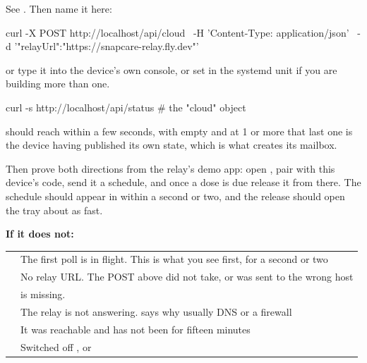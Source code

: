 \documentclass[11pt,a4paper]{article}
\begin{document}
\noindent See . Then name it here:

\begin{shell}
curl -X POST http://localhost/api/cloud \
     -H 'Content-Type: application/json' \
     -d '{"relayUrl":"https://snapcare-relay.fly.dev"}'
\end{shell}

\noindent or type it into the device's own console, or set
 in the systemd unit if you are building more than
one.

\begin{provebox}
\provetitle
\begin{shell}
curl -s http://localhost/api/status     # the "cloud" object
\end{shell}
\code{state} should reach \code{connected} within a few seconds, with
 empty and  at 1 or more \textemdash{} that
last one is the device having published its own state, which is what creates its
mailbox.

\vspace{1ex}
Then prove both directions from the relay's demo app: open
, pair with this device's code, send it a
schedule, and \textemdash{} once a dose is due \textemdash{} release it from
there. The schedule should appear in \code{payload} within a second or two, and
the release should open the tray about as fast.
\end{provebox}

\vspace{1mm}
\noindent\textbf{\sffamily If it does not:}

\begin{center}
\small
\begin{tabular}{@{}l >{\raggedright\arraybackslash}p{100mm}@{}}
\toprule
\hdr{\code{state}} & \hdr{What it means} \\
\midrule
\code{connecting} & The first poll is in flight. This is what you see first, for a second or two \\
\code{unpaired} & No relay URL. The POST above did not take, or was sent to the wrong host \\
\code{unsupported} & \code{python3-cryptography} is missing. \code{sudo apt install python3-cryptography} \\
\code{retrying} & The relay is not answering. \code{lastError} says why \textemdash{} usually DNS or a firewall \\
\code{offline} & It was reachable and has not been for fifteen minutes \\
\code{off} & Switched off \textemdash{} \code{-{}-no-cloud}, or \code{SNAPCARE\_CLOUD=0} \\
\bottomrule
\end{tabular}
\end{center}
\end{document}
